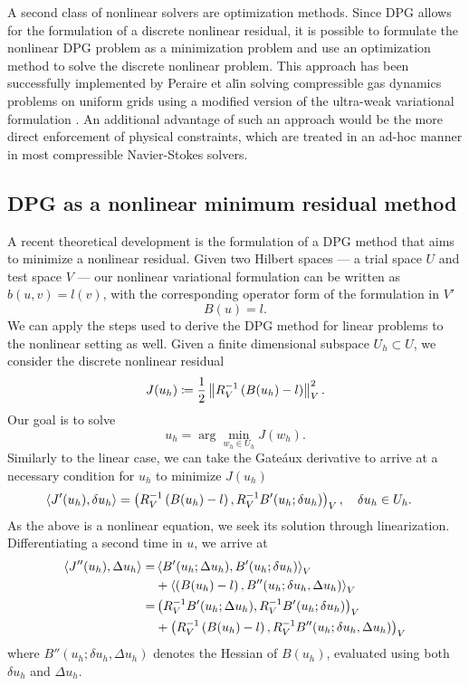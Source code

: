 A second class of nonlinear solvers are optimization methods.  Since DPG allows for the formulation of a discrete nonlinear residual, it is possible to formulate the nonlinear DPG problem as a minimization problem and use an optimization method to solve the discrete nonlinear problem.  This approach has been successfully implemented by Peraire et al\. in solving compressible gas dynamics problems on uniform grids using a modified version of the ultra-weak variational formulation \cite{MITDPG}.  An additional advantage of such an approach would be the more direct enforcement of physical constraints, which are treated in an ad-hoc manner in most compressible Navier-Stokes solvers.  

\subsection{DPG as a nonlinear minimum residual method}

A recent theoretical development is the formulation of a DPG method that aims to minimize a nonlinear residual. Given two Hilbert spaces --- a trial space $U$ and test space $V$ --- our nonlinear variational formulation can be written as $b(u,v) = l(v)$, with the corresponding operator form of the formulation in $V'$
\[
B(u) = l.
\]
We can apply the steps used to derive the DPG method for linear problems to the nonlinear setting as well. Given a finite dimensional subspace $U_h \subset U$, we consider the discrete nonlinear residual
\[
J(u_h) \coloneqq \frac{1}{2}\nor{R_V^{-1}\left(B(u_h)-l\right)}_V^2.
\]
Our goal is to solve
\[
u_h = \arg \min_{w_h\in U_h}J(w_h).
\]
Similarly to the linear case, we can take the Gate\'aux derivative to arrive at a necessary condition for $u_h$ to minimize $J(u_h)$ 
\begin{align*}
\LRa{J'(u_h), \delta u_h} &= \LRp{R_V^{-1}\left(B(u_h)-l\right),R_V^{-1}B'(u_h;\delta u_h)}_V, \quad \delta u_h \in U_h. 
\end{align*}
As the above is a nonlinear equation, we seek its solution through linearization. Differentiating a second time in $u$, we arrive at
\begin{align*}
\LRa{J''(u_h), \Delta u_h} =& \LRa{B'(u_h;\Delta u_h), B'(u_h;\delta u_h)}_V \\
& + \LRa{\left(B(u_h)-l\right),B''(u_h;\delta u_h,\Delta u_h)}_V \\
=& \LRp{R_V^{-1}B'(u_h;\Delta u_h), R_V^{-1}B'(u_h;\delta u_h)}_V \\
& + \LRp{R_V^{-1}\left(B(u_h)-l\right),R_V^{-1}B''(u_h;\delta u_h,\Delta u_h)}_V 
\end{align*}
where $B''(u_h;\delta u_h,\Delta u_h)$ denotes the Hessian of $B(u_h)$, evaluated using both $\delta u_h$ and $\Delta u_h$. 

